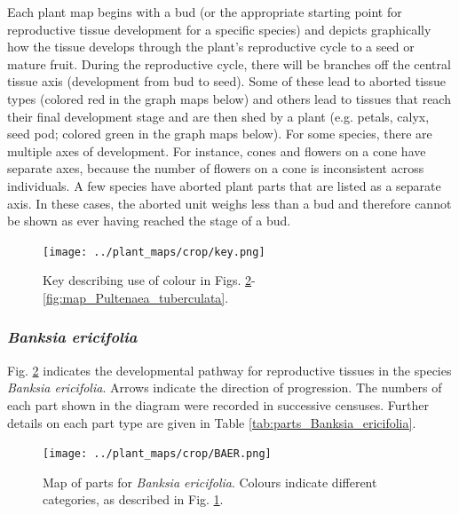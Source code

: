 \documentclass[10pt,twoside]{article}\usepackage[]{graphicx}\usepackage[]{color}
\begin{document}
Each plant map begins with a bud (or the appropriate starting point for reproductive tissue development for a specific species) and depicts graphically how the tissue develops through the plant's reproductive cycle to a seed or mature fruit. During the reproductive cycle, there will be branches off the central tissue axis (development from bud to seed). Some of these lead to aborted tissue types (colored red in the graph maps below) and others lead to tissues that reach their final development stage and are then shed by a plant (e.g. petals, calyx, seed pod; colored green in the graph maps below). For some species, there are multiple axes of development. For instance, cones and flowers on a cone have separate axes, because the number of flowers on a cone is inconsistent across individuals. A few species have aborted plant parts that are listed as a separate axis. In these cases, the aborted unit weighs less than a bud and therefore cannot be shown as ever having reached the stage of a bud.

\begin{figure}[h]
\centering
\texttt{[image: ../plant\_maps/crop/key.png]}
\caption{Key describing use of colour in Figs. \ref{fig:map_Banksia_ericifolia}-\ref{fig:map_Pultenaea_tuberculata}.}
\label{fig:map_key}
\end{figure}
\clearpage

\subsubsection{\emph{Banksia ericifolia}}

Fig. \ref{fig:map_Banksia_ericifolia} indicates the developmental pathway for reproductive tissues in the species \emph{Banksia ericifolia}. Arrows indicate the direction of progression.  The numbers of each part shown in the diagram were recorded in successive censuses. Further details on each part type are given in Table \ref{tab:parts_Banksia_ericifolia}.

\begin{figure}[h]
\centering
\texttt{[image: ../plant\_maps/crop/BAER.png]}
\caption{Map of parts for \emph{Banksia ericifolia}. Colours indicate different categories, as described in Fig. \ref{fig:map_key}.}
\label{fig:map_Banksia_ericifolia}
\end{figure}
\end{document}
